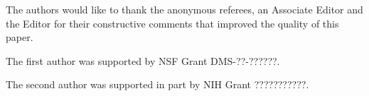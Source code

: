 \documentclass[bj,authoryear]{imsart}
\theoremstyle{plain}
\theoremstyle{definition}
\begin{document}
\begin{acks}[Acknowledgments]
The authors would like to thank the anonymous referees, an Associate
Editor and the Editor for their constructive comments that improved the
quality of this paper.
\end{acks}

\begin{funding}
The first author was supported by NSF Grant DMS-??-??????.

The second author was supported in part by NIH Grant ???????????.
\end{funding}

\begin{supplement}
\end{supplement}
\begin{supplement}
\end{supplement}

\end{document}
